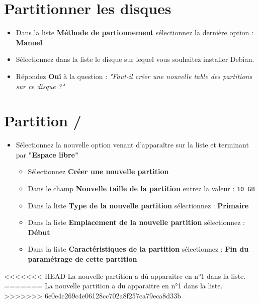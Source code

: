 \section{Partitionner les disques}
\begin{itemize}
	\item Dans la liste \textbf{Méthode de partionnement} sélectionnez la dernière option : \textbf{Manuel}
	\item Sélectionnez dans la liste le disque sur lequel vous souhaitez installer Debian.
	\item Répondez \textbf{Oui} à la question : \textit{"Faut-il créer une nouvelle table des partitions sur ce disque ?"}
\end{itemize}

\section{Partition /}
	\begin{itemize}
	\item Sélectionnez la nouvelle option venant d'apparaître sur la liste et terminant par \textbf{"Espace libre"}
		\begin{itemize}
			\item Sélectionnez \textbf{Créer une nouvelle partition}
			\item Dans le champ \textbf{Nouvelle taille de la partition} entrez la valeur : \texttt{10 GB}
			\item Dans la liste \textbf{Type de la nouvelle partition} sélectionnez : \textbf{Primaire}
			\item Dans la liste \textbf{Emplacement de la nouvelle partition} sélectionnez : \textbf{Début}
			\item Dans la liste \textbf{Caractéristiques de la partition} sélectionnez : \textbf{Fin du paramétrage de cette partition}\\	
		\end{itemize}
	\end{itemize}
<<<<<<< HEAD
La nouvelle partition a dû apparaitre en n°1 dans la liste.
=======
La nouvelle partition a du apparaitre en n°1 dans la liste.
>>>>>>> 6e0e4c269c4e06128cc702a8f257ca79eca8d33b
		
